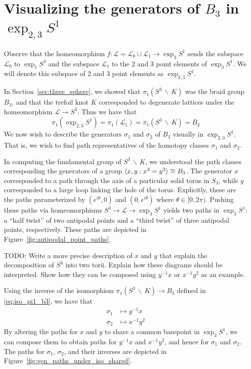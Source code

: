 \documentclass[12pt,twoside]{reedthesis}
\theoremstyle{definition}
\newcommand{\LS}{\mathcal{L}}
\newcommand{\wo}{\, \backslash \,}
\newcommand{\TODO}[1]{{\color{todopink}\textsf{TODO: #1}}}
\DeclarePairedDelimiter\ang{\langle}{\rangle}
\begin{document}
\section{Visualizing the generators of $B_3$ in $\exp_{2,3} S^1$}

Observe that the homeomorphism $f : \LS = \LS_0 \cup \LS_1 \to \exp_3 S^1$ sends the subspace $\LS_0 $ to $\exp_1 S^3$ and the subspace $\LS_1$ to the 2 and 3 point elements of $\exp_3 S^1$.
We will denote this subspace of 2 and 3 point elements as $\exp_{2,3} S^1$.

In Section~\ref{sec:three_sphere}, we showed that $\pi_1(S^3 \wo K)$ was the braid group $B_3$, and that the trefoil knot $K$ corresponded to degenerate lattices under the homeomorphism $\LS \to S^3$.
Thus we have that
\begin{equation*}
  \pi_1(\exp_{2,3} S^1) = \pi_1(\LS_1) = \pi_1(S^3 \wo K) = B_3
\end{equation*}
We now wish to describe the generators $\sigma_1$ and $\sigma_2$ of $B_3$ visually in $\exp_{2,3} S^1$.
That is, we wish to find path representatives of the homotopy classes $\sigma_1$ and $\sigma_2$.

In computing the fundamental group of $S^3 \wo K$, we understood the path classes corresponding the generators of a group $\ang{x, y : x^2 = y^3} \cong B_3$.
The generator $x$ corresponded to a path through the axis of a particular solid torus in $S_3$, while $y$ corresponded to a large loop linking the hole of the torus.
Explicitly, these are the paths parameterized by $(e^{i \theta}, 0)$ and $(0, e^{i \theta})$ where $\theta \in [0, 2 \pi)$.
Pushing these paths via homeomorphisms $S^3 \to \LS \to \exp_3 S^1$ yields two paths in $\exp_3 S^1$: a ``half twist'' of two antipodal points and a ``third twist'' of three antipodal points, respectively.
These paths are depicted in Figure~\ref{fig:antipodal_point_paths}.

\TODO{Write a more precise description of $x$ and $y$ that explain the decomposition of $S^3$ into two torii. Explain how these diagrams should be interpreted. Show how they can be composed using $y^{-1} x$ or $x^{-1} y^2$ as an example.}

Using the inverse of the isomorphism $\pi_1(S^3 \wo K) \to B_3$ defined in \eqref{eq:iso_pi1_b3}, we have that
\begin{align*}
  \sigma_1 &\mapsto y^{-1} x \\
  \sigma_2 &\mapsto x^{-1} y^2
\end{align*}
By altering the paths for $x$ and $y$ to share a common basepoint in $\exp_3 S^1$, we can compose them to obtain paths for $y^{-1} x$ and $x^{-1} y^2$, and hence for $\sigma_1$ and $\sigma_2$.
The paths for $\sigma_1$, $\sigma_2$, and their inverses are depicted in Figure~\ref{fig:gen_paths_under_iso_shared}.
\end{document}
